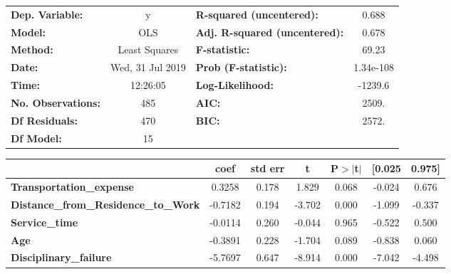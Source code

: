 \documentclass{report}
\begin{document}
\begin{center}
\begin{tabular}{lclc}
\toprule
\textbf{Dep. Variable:}                      &        y         & \textbf{  R-squared (uncentered):}      &     0.688   \\
\textbf{Model:}                              &       OLS        & \textbf{  Adj. R-squared (uncentered):} &     0.678   \\
\textbf{Method:}                             &  Least Squares   & \textbf{  F-statistic:       }          &     69.23   \\
\textbf{Date:}                               & Wed, 31 Jul 2019 & \textbf{  Prob (F-statistic):}          & 1.34e-108   \\
\textbf{Time:}                               &     12:26:05     & \textbf{  Log-Likelihood:    }          &   -1239.6   \\
\textbf{No. Observations:}                   &         485      & \textbf{  AIC:               }          &     2509.   \\
\textbf{Df Residuals:}                       &         470      & \textbf{  BIC:               }          &     2572.   \\
\textbf{Df Model:}                           &          15      & \textbf{                     }          &             \\
\bottomrule
\end{tabular}
\begin{tabular}{lcccccc}
                                             & \textbf{coef} & \textbf{std err} & \textbf{t} & \textbf{P$> |$t$|$} & \textbf{[0.025} & \textbf{0.975]}  \\
\midrule
\textbf{Transportation\_expense}             &       0.3258  &        0.178     &     1.829  &         0.068        &       -0.024    &        0.676     \\
\textbf{Distance\_from\_Residence\_to\_Work} &      -0.7182  &        0.194     &    -3.702  &         0.000        &       -1.099    &       -0.337     \\
\textbf{Service\_time}                       &      -0.0114  &        0.260     &    -0.044  &         0.965        &       -0.522    &        0.500     \\
\textbf{Age}                                 &      -0.3891  &        0.228     &    -1.704  &         0.089        &       -0.838    &        0.060     \\
\textbf{Disciplinary\_failure}               &      -5.7697  &        0.647     &    -8.914  &         0.000        &       -7.042    &       -4.498     \\

\end{tabular}
\end{center}
\end{document}

